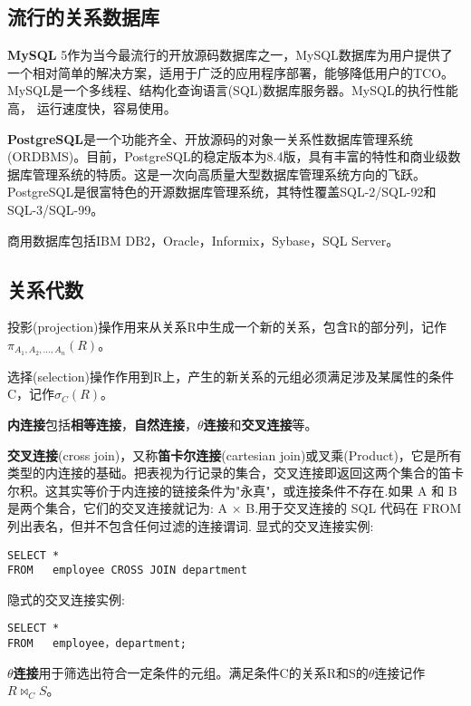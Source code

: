 \subsection{流行的关系数据库}

\textbf{MySQL} 5作为当今最流行的开放源码数据库之一，MySQL数据库为用户提供了一个相对简单的解决方案，适用于广泛的应用程序部署，能够降低用户的TCO。
MySQL是一个多线程、结构化查询语言(SQL)数据库服务器。MySQL的执行性能高， 运行速度快，容易使用。

\textbf{PostgreSQL}是一个功能齐全、开放源码的对象一关系性数据库管理系统 (ORDBMS)。目前，PostgreSQL的稳定版本为8.4版，具有丰富的特性和商业级数据库管理系统的特质。这是一次向高质量大型数据库管理系统方向的飞跃。
PostgreSQL是很富特色的开源数据库管理系统，其特性覆盖SQL-2/SQL-92和SQL-3/SQL-99。


商用数据库包括IBM DB2，Oracle，Informix，Sybase，SQL Server。

\subsection{关系代数}

投影(projection)操作用来从关系R中生成一个新的关系，包含R的部分列，记作$\pi_{A_1,A_2,\dots,A_n}(R)$。

选择(selection)操作作用到R上，产生的新关系的元组必须满足涉及某属性的条件C，记作$\sigma_C(R)$。

\textbf{内连接}包括\textbf{相等连接}，\textbf{自然连接}，\textbf{$\theta$连接}和\textbf{交叉连接}等。

\textbf{交叉连接}(cross join)，又称\textbf{笛卡尔连接}(cartesian join)或叉乘(Product)，它是所有类型的内连接的基础。把表视为行记录的集合，交叉连接即返回这两个集合的笛卡尔积。这其实等价于内连接的链接条件为"永真"，或连接条件不存在.如果 A 和 B 是两个集合，它们的交叉连接就记为: A × B.用于交叉连接的 SQL 代码在 FROM 列出表名，但并不包含任何过滤的连接谓词.
显式的交叉连接实例:

\begin{verbatim}
SELECT *
FROM   employee CROSS JOIN department
\end{verbatim}

隐式的交叉连接实例:

\begin{verbatim}
SELECT *
FROM   employee，department;
\end{verbatim}


\textbf{$\theta$连接}用于筛选出符合一定条件的元组。满足条件C的关系R和S的$\theta$连接记作$R \Join _{C} S$。

